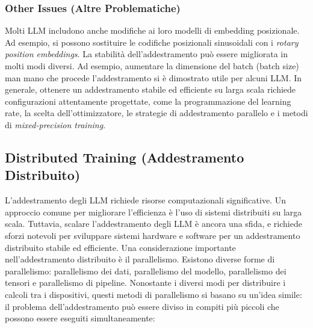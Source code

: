 \subsubsection{Other Issues (Altre Problematiche)}
Molti LLM includono anche modifiche ai loro modelli di embedding posizionale. Ad esempio, si possono sostituire le codifiche posizionali sinusoidali con i \textit{rotary position embeddings}. La stabilità dell'addestramento può essere migliorata in molti modi diversi. Ad esempio, aumentare la dimensione del batch (batch size) man mano che procede l'addestramento si è dimostrato utile per alcuni LLM. In generale, ottenere un addestramento stabile ed efficiente su larga scala richiede configurazioni attentamente progettate, come la programmazione del learning rate, la scelta dell'ottimizzatore, le strategie di addestramento parallelo e i metodi di \textit{mixed-precision training}.

\subsection{Distributed Training (Addestramento Distribuito)}
L'addestramento degli LLM richiede risorse computazionali significative. Un approccio comune per migliorare l'efficienza è l'uso di sistemi distribuiti su larga scala. Tuttavia, scalare l'addestramento degli LLM è ancora una sfida, e richiede sforzi notevoli per sviluppare sistemi hardware e software per un addestramento distribuito stabile ed efficiente.
Una considerazione importante nell'addestramento distribuito è il parallelismo. Esistono diverse forme di parallelismo: parallelismo dei dati, parallelismo del modello, parallelismo dei tensori e parallelismo di pipeline. Nonostante i diversi modi per distribuire i calcoli tra i dispositivi, questi metodi di parallelismo si basano su un'idea simile: il problema dell'addestramento può essere diviso in compiti più piccoli che possono essere eseguiti simultaneamente:

